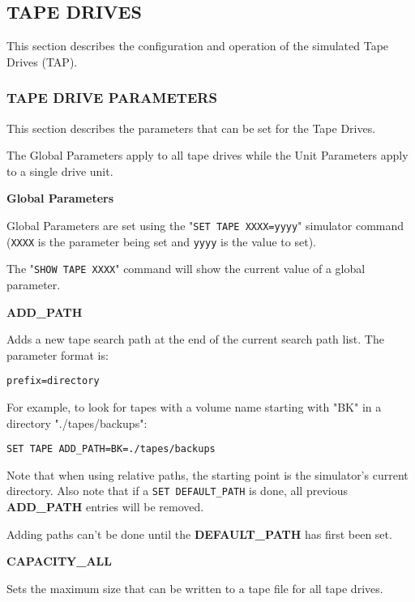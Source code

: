 \subsection[Tape Drives]{TAPE DRIVES}

This section describes the configuration and operation of the simulated Tape Drives (TAP).

\subsubsection[Operator Console Options]{TAPE DRIVE PARAMETERS}

This section describes the parameters that can be set for the Tape Drives. 

The Global Parameters apply to all tape drives while the Unit Parameters apply to a single drive unit.

\textbf{Global Parameters}

Global Parameters are set using the "\texttt{SET TAPE XXXX=yyyy}" simulator command (\texttt{XXXX} is the parameter being 
set and \texttt{yyyy} is the value to set). 

The "\texttt{SHOW TAPE XXXX}" command will show the current value of a global parameter.

\textbf{ADD\_PATH}

\begin{adjustwidth}{5ex}{1ex}
	Adds a new tape search path at the end of the current search path list. The parameter format is:
\begin{adjustwidth}{5ex}{1ex}
	\texttt{prefix=directory}
\end{adjustwidth}  
	For example, to look for tapes with a volume name starting with "BK" in a directory "./tapes/backups":
\begin{adjustwidth}{5ex}{1ex}
	\texttt{SET TAPE ADD\_PATH=BK=./tapes/backups}
\end{adjustwidth}  
	Note that when using relative paths, the starting point is the simulator's current directory.
	Also note that if a \texttt{SET DEFAULT\_PATH} is done, all previous \textbf{ADD\_PATH} entries
	will be removed.
	
	Adding paths can't be done until the \textbf{DEFAULT\_PATH} has first been set.
\end{adjustwidth}  

\textbf{CAPACITY\_ALL}

\begin{adjustwidth}{5ex}{1ex}
	Sets the maximum size that can be written to a tape file for all tape drives.
\end{adjustwidth}  

